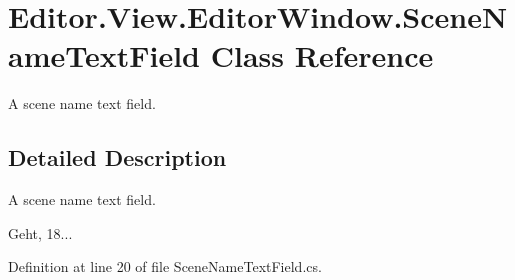 \section{Editor.\-View.\-Editor\-Window.\-Scene\-Name\-Text\-Field Class Reference}
\label{class_editor_1_1_view_1_1_editor_window_1_1_scene_name_text_field}


A scene name text field.  




\subsection{Detailed Description}
A scene name text field. 

Geht, 18... 

Definition at line 20 of file Scene\-Name\-Text\-Field.\-cs.

